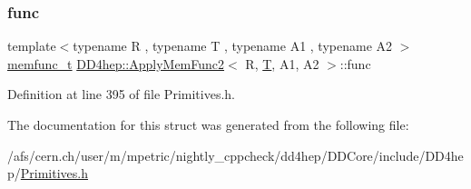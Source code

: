 \subsubsection{\texorpdfstring{func}{func}}
{\footnotesize\ttfamily template$<$typename R , typename T , typename A1 , typename A2 $>$ \\
\hyperlink{struct_d_d4hep_1_1_apply_mem_func2_a73ec255989fcf165046db1689d8c748a}{memfunc\+\_\+t} \hyperlink{struct_d_d4hep_1_1_apply_mem_func2}{D\+D4hep\+::\+Apply\+Mem\+Func2}$<$ R, \hyperlink{class_t}{T}, A1, A2 $>$\+::func}



Definition at line 395 of file Primitives.\+h.



The documentation for this struct was generated from the following file\+:\begin{DoxyCompactItemize}
\item 
/afs/cern.\+ch/user/m/mpetric/nightly\+\_\+cppcheck/dd4hep/\+D\+D\+Core/include/\+D\+D4hep/\hyperlink{_primitives_8h}{Primitives.\+h}\end{DoxyCompactItemize}
